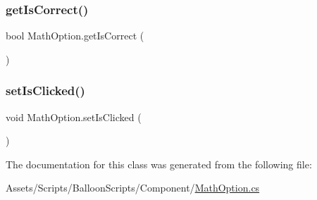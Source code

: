\mbox{\label{classMathOption_aaa591898e3b2f7fc10051ffeb8b7f504}} 
\subsubsection{\texorpdfstring{get\+Is\+Correct()}{getIsCorrect()}}
{\footnotesize\ttfamily bool Math\+Option.\+get\+Is\+Correct (\begin{DoxyParamCaption}{ }\end{DoxyParamCaption})\hspace{0.3cm}{\ttfamily [inline]}}

\mbox{\label{classMathOption_a08e458e3fb9a8e94c8116e42febc85bb}} 
\subsubsection{\texorpdfstring{set\+Is\+Clicked()}{setIsClicked()}}
{\footnotesize\ttfamily void Math\+Option.\+set\+Is\+Clicked (\begin{DoxyParamCaption}{ }\end{DoxyParamCaption})\hspace{0.3cm}{\ttfamily [inline]}}



The documentation for this class was generated from the following file\+:\begin{DoxyCompactItemize}
\item 
Assets/\+Scripts/\+Balloon\+Scripts/\+Component/\hyperlink{MathOption_8cs}{Math\+Option.\+cs}\end{DoxyCompactItemize}
